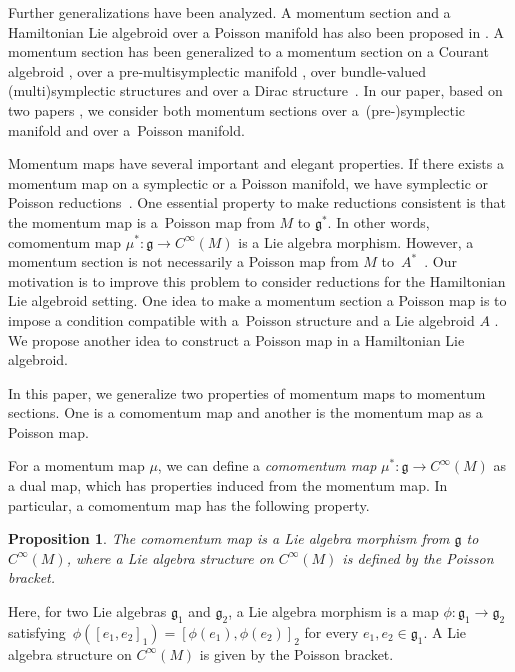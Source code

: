 \documentclass[10pt,a4paper]{amsart}
\numberwithin{equation}{section}
\newtheorem{Proposition}[Theorem]{Proposition}
 { \theoremstyle{definition}
\newtheorem{Definition}[Theorem]{Definition}
\newtheorem{Note}[Theorem]{Note}
\newtheorem{Example}[Theorem]{Example}
\newtheorem{Remark}[Theorem]{Remark}
\newtheorem{Question}[Theorem]{Question}
 }
\begin{document}
Further generalizations have been analyzed.
A momentum section and a Hamiltonian Lie algebroid over a Poisson manifold has also been proposed in \cite{Blohmann:2023}.
A momentum section has been generalized to a momentum section on a Courant algebroid \cite{Ikeda:2021fjk}, over a pre-multisymplectic mani\-fold \cite{Hirota:2021isx}, over bundle-valued (multi)symplectic structures \cite{Hirota:2023xqd} and over a Dirac structure~\cite{Ikeda:2023pdr}.
In our paper, based on two papers \cite{Blohmann:2023,Blohmann:2018},
we consider both momentum sections over \mbox{a~(pre-)symplectic} manifold and over a~Poisson manifold.

Momentum maps have several important and elegant properties.
If there exists a momentum map on a symplectic or a Poisson manifold, we have symplectic \cite{MarsdenWeinstein, Meyer} or Poisson reductions~\cite{MarsdenRatiu}.
One essential property to make reductions consistent is that the momentum map is a~Poisson map from $M$ to $\mathfrak{g}^*$.
In other words, comomentum map $\mu^*\colon \mathfrak{g} \rightarrow C^{\infty}(M)$
is a Lie algebra morphism.
However, a momentum section is not necessarily a Poisson map from $M$ to~$A^*$~\cite{Blohmann:2023}.
Our motivation is to improve this problem to consider reductions for the Hamiltonian Lie algebroid setting.
One idea to make a momentum section a Poisson map is to impose a condition compatible with a~Poisson structure and a Lie algebroid $A$ \cite{Hirota:2023xqd}.
We propose another idea to construct a Poisson map in a Hamiltonian Lie algebroid.

In this paper, we generalize two properties of momentum maps to momentum sections. One is a comomentum map and another is the momentum map as a Poisson map.

For a momentum map $\mu$, we can define a \textit{comomentum map}
$\mu^*\colon \mathfrak{g} \rightarrow C^{\infty}(M)$ as a dual map,
which has properties induced from the momentum map.
In particular, a comomentum map has the following property.

\begin{Proposition}
The comomentum map is a Lie algebra morphism from $\mathfrak{g}$ to $C^{\infty}(M)$, where a Lie algebra structure on $C^{\infty}(M)$ is defined by the Poisson bracket.
\end{Proposition}
Here, for two Lie algebras $\mathfrak{g}_1$ and $\mathfrak{g}_2$,
a Lie algebra morphism is a map $\phi\colon\mathfrak{g}_1 \rightarrow \mathfrak{g}_2$ satisfying~${\phi([e_1, e_2]_1) = [\phi(e_1), \phi(e_2)]_2}$
for every $e_1, e_2 \in \mathfrak{g}_1$.
A Lie algebra structure on $C^{\infty}(M)$ is given by the Poisson bracket.
\end{document}
